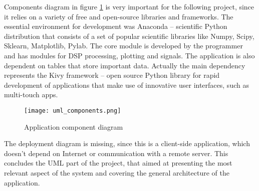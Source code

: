 Components diagram in figure \ref{fig:umlcomponents} is very important for the following project, since it relies on a variety of free and open-source libraries and frameworks. The essential environment for development was Anaconda -- scientific Python distribution that consists of a set of popular scientific libraries like Numpy, Scipy, Sklearn, Matplotlib, Pylab. The core module is developed by the programmer and has modules for DSP processing, plotting and signals. The application is also dependent on tables that store important data. Actually the main dependency represents the Kivy framework -- open source Python library for rapid development of applications that make use of innovative user interfaces, such as multi-touch apps.

\begin{figure}[!ht]
\centering
  \texttt{[image: uml\_components.png]}
\caption{Application component diagram}
\label{fig:umlcomponents}
\end{figure}

The deployment diagram is missing, since this is a client-side application, which doesn't depend on Internet or communication with a remote server. This concludes the UML part of the project, that aimed at presenting the most relevant aspect of the system and covering the general architecture of the application.

\clearpage
